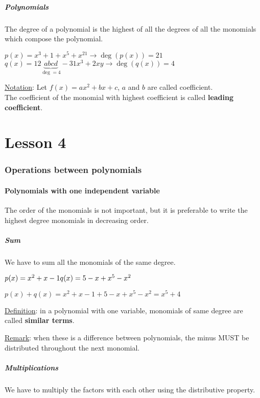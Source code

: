 \documentclass{article}
\newcommand{\figbox}[1]{ 
    \begin{figure*}[ht!]        
        \begin{center}            
            \fbox{#1}        
        \end{center}    
    \end{figure*}
}
\begin{document}
\subsubsection{Polynomials}
The degree of a polynomial is the highest of all the degrees of all the
monomials which compose the polynomial.

$p(x)=x^3+1+x^5+x^21 \rightarrow \deg(p(x))=21$\\
$q(x)=12 \underbrace{abcd}_{\deg=4} - 31x^3+2xy \rightarrow \deg(q(x))=4$ 

\underline{Notation}: Let $f(x)=ax^2+bx+c$, $a$ and $b$ are called coefficient.\\
The coefficient of the monomial with highest coefficient is called \textbf{leading coefficient}.

\newpage
\part{Lesson 4}
\section{Operations between polynomials}
\subsection{Polynomials with one independent variable}
The order of the monomials is not important, but it is preferable to write
the highest degree monomials in decreasing order.
\figbox{$p(x)=ax^2-bx+c$}

\subsubsection{Sum}
We have to sum all the monomials of the same degree.

$p(x)=x^2+x-1\\
q(x)=5-x+x^5-x^2$

$p(x)+q(x)=x^2+x-1+5-x+x^5-x^2=x^5+4$

\underline{Definition}: in a polynomial with one variable, monomials of same
degree are called \textbf{similar terms}.

\underline{Remark}: when these is a difference between polynomials, the minus MUST be distributed throughout the next monomial.

\subsubsection{Multiplications}
We have to multiply the factors with each other using the distributive property.
\end{document}
